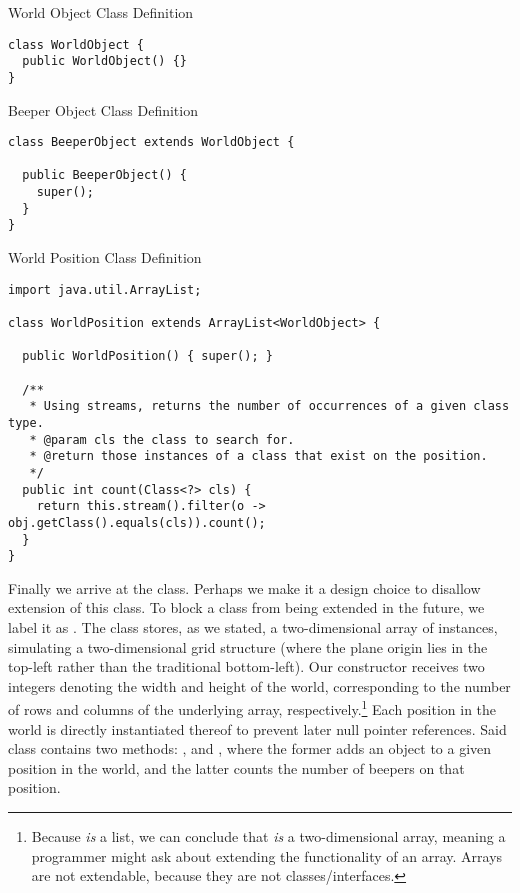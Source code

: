 \begin{cl}{World Object Class Definition}
\begin{lstlisting}[language=MyJava]
class WorldObject {
  public WorldObject() {}
}
\end{lstlisting}
\end{cl}

\begin{cl}{Beeper Object Class Definition}
\begin{lstlisting}[language=MyJava]
class BeeperObject extends WorldObject {
  
  public BeeperObject() { 
    super(); 
  }
}
\end{lstlisting}
\end{cl}

\begin{cl}{World Position Class Definition}
\begin{lstlisting}[language=MyJava]
import java.util.ArrayList;

class WorldPosition extends ArrayList<WorldObject> {

  public WorldPosition() { super(); }

  /**
   * Using streams, returns the number of occurrences of a given class type.
   * @param cls the class to search for.
   * @return those instances of a class that exist on the position.
   */
  public int count(Class<?> cls) {
    return this.stream().filter(o -> obj.getClass().equals(cls)).count();
  }
}
\end{lstlisting}
\end{cl}

Finally we arrive at the  class. Perhaps we make it a design choice to disallow extension of this class. To block a class from being extended in the future, we label it as . The  class stores, as we stated, a two-dimensional array of  instances, simulating a two-dimensional grid structure (where the plane origin lies in the top-left rather than the traditional bottom-left). Our constructor receives two integers denoting the width and height of the world, corresponding to the number of rows and columns of the underlying array, respectively.\footnote{Because  \textit{is} a list, we can conclude that  \textit{is} a two-dimensional array, meaning a programmer might ask about extending the functionality of an array. Arrays are not extendable, because they are not classes/interfaces.} Each position in the world is directly instantiated thereof to prevent later null pointer references. Said  class contains two methods: , and , where the former adds an object to a given position in the world, and the latter counts the number of beepers on that position.

